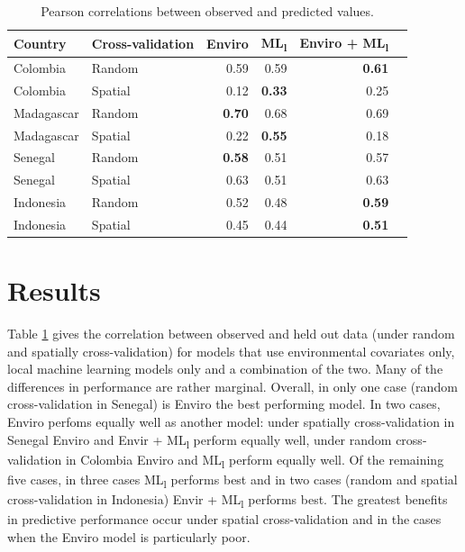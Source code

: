 \documentclass[review]{elsarticle}
\begin{document}
\begin{table}[t!]
\caption{Pearson correlations between observed and predicted values. }
\centering
\begin{tabular}{llrrrr}
Country &  Cross-validation & Enviro &  ML\textsubscript{l} &  Enviro + ML\textsubscript{l} \\
\hline 
 Colombia & Random &  0.59 & 0.59 & \textbf{0.61} \\
 Colombia &  Spatial &  0.12 &  \textbf{0.33} &  0.25\\
 Madagascar & Random &   \textbf{0.70} &  0.68 & 0.69 \\
 Madagascar &  Spatial &  0.22 &  \textbf{0.55} & 0.18\\
 Senegal &  Random &  \textbf{0.58} &  0.51 & 0.57 \\
 Senegal &  Spatial &  0.63 &  0.51 &  0.63 \\
 Indonesia &  Random &  0.52 &  0.48 &  \textbf{0.59} \\
 Indonesia &  Spatial &  0.45 &  0.44 &  \textbf{0.51} \\
\end{tabular}
\label{t:results}
\end{table}


\section{Results}





Table \ref{t:results} gives the correlation between observed and held out data (under random and spatially cross-validation) for models that use environmental covariates only, local machine learning models only and a combination of the two.
Many of the differences in performance are rather marginal.
Overall, in only one case (random cross-validation in Senegal) is Enviro the best performing model.
In two cases, Enviro perfoms equally well as another model: under spatially cross-validation in Senegal Enviro and Envir + ML\textsubscript{l} perform equally well, under random cross-validation in Colombia Enviro and ML\textsubscript{l} perform equally well.
Of the remaining five cases, in three cases ML\textsubscript{l} performs best and in two cases (random and spatial cross-validation in Indonesia) Envir + ML\textsubscript{l} performs best.
The greatest benefits in predictive performance occur under spatial cross-validation and in the cases when the Enviro model is particularly poor.
\end{document}
